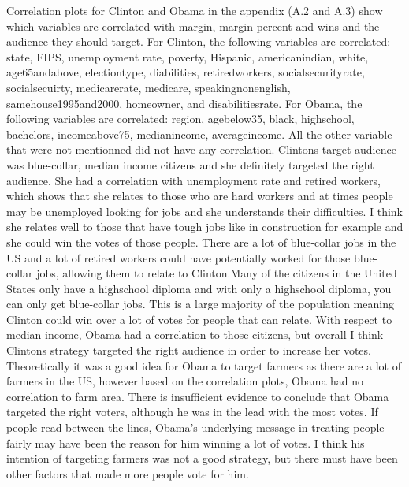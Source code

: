 \documentclass[11pt]{article}
\begin{document}
Correlation plots for Clinton and Obama in the appendix (A.2 and A.3) show which variables are correlated with margin, margin percent and wins and the audience they should target. For Clinton, the following variables are correlated: state, FIPS, unemployment rate, poverty, Hispanic, americanindian, white, age65andabove, electiontype, diabilities, retiredworkers, socialsecurityrate, socialsecuirty, medicarerate, medicare, speakingnonenglish, samehouse1995and2000, homeowner, and disabilitiesrate. For Obama, the following variables are correlated: region, agebelow35, black, highschool, bachelors, incomeabove75, medianincome, averageincome. All the other variable that were not mentionned did not have any correlation. Clintons target audience was blue-collar, median income citizens and she definitely targeted the right audience. She had a correlation with unemployment rate and retired workers, which shows that she relates to those who are hard workers and at times people may be unemployed looking for jobs and she understands their difficulties. I think she relates well to those that have tough jobs like in construction for example and she could win the votes of those people. There are a lot of blue-collar jobs in the US and a lot of retired workers could have potentially worked for those blue-collar jobs, allowing them to relate to Clinton.Many of the citizens in the United States only have a highschool diploma and with only a highschool diploma, you can only get blue-collar jobs. This is a large majority of the population meaning Clinton could win over a lot of votes for people that can relate. With respect to median income, Obama had a correlation to those citizens, but overall I think Clintons strategy targeted the right audience in order to increase her votes. Theoretically it was a good idea for Obama to target farmers as there are a lot of farmers in the US, however based on the correlation plots, Obama had no correlation to farm area. There is insufficient evidence to conclude that Obama targeted the right voters, although he was in the lead with the most votes. If people read between the lines, Obama’s underlying message in treating people fairly may have been the reason for him winning a lot of votes. I think his intention of targeting farmers was not a good strategy, but there must have been other factors that made more people vote for him. 
\end{document}
